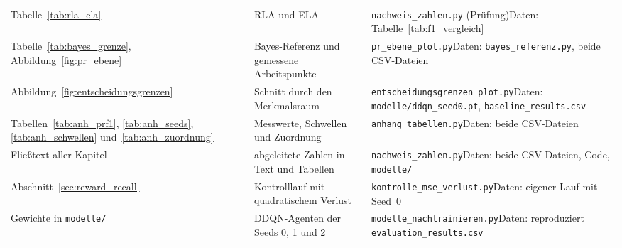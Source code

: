 \begin{tabular}{@{}L{2.8cm}L{4.6cm}L{7.4cm}@{}}
Tabelle~\ref{tab:rla_ela} & RLA und ELA & \texttt{nachweis\_zahlen.py} (Prüfung)\newline Daten: Tabelle~\ref{tab:f1_vergleich} \\
Tabelle~\ref{tab:bayes_grenze}, Abbildung~\ref{fig:pr_ebene} & Bayes-Referenz und gemessene Arbeitspunkte & \texttt{pr\_ebene\_plot.py}\newline Daten: \texttt{bayes\_referenz.py}, beide CSV-Dateien \\
Abbildung~\ref{fig:entscheidungsgrenzen} & Schnitt durch den Merkmalsraum & \texttt{entscheidungsgrenzen\_plot.py}\newline Daten: \texttt{modelle/ddqn\_seed0.pt}, \texttt{baseline\_results.csv} \\
Tabellen~\ref{tab:anh_prf1}, \ref{tab:anh_seeds}, \ref{tab:anh_schwellen} und~\ref{tab:anh_zuordnung} & Messwerte, Schwellen und Zuordnung & \texttt{anhang\_tabellen.py}\newline Daten: beide CSV-Dateien \\
Fließtext aller Kapitel & abgeleitete Zahlen in Text und Tabellen & \texttt{nachweis\_zahlen.py}\newline Daten: beide CSV-Dateien, Code, \texttt{modelle/} \\
Abschnitt~\ref{sec:reward_recall} & Kontrolllauf mit quadratischem Verlust & \texttt{kontrolle\_mse\_verlust.py}\newline Daten: eigener Lauf mit Seed~0 \\
Gewichte in \texttt{modelle/} & DDQN-Agenten der Seeds 0, 1 und 2 & \texttt{modelle\_nachtrainieren.py}\newline Daten: reproduziert \texttt{evaluation\_results.csv} \\
\bottomrule
\end{tabular}
